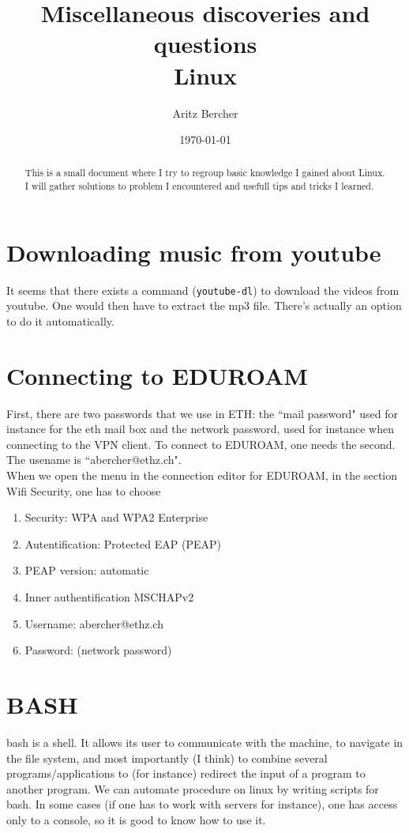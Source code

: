 \documentclass[11pt,a4paper]{article} %
\title{Miscellaneous discoveries and questions\\ Linux}
\author{Aritz Bercher}
\date{\today}
\begin{document}
\maketitle

\begin{abstract}
This is a small document where I try to regroup basic knowledge I gained about Linux. I will gather solutions to problem I encountered and usefull tips and tricks I learned.
\end{abstract}

\section{Downloading music from youtube}
It seems that there exists a command (\texttt{youtube-dl}) to download the videos from youtube. One would then have to extract the mp3 file. There's actually an option to do it automatically.

\section{Connecting to EDUROAM}
First, there are two passwords that we use in ETH: the ``mail password" used for instance for the eth mail box and the network password, used for instance when connecting to the VPN client. To connect to EDUROAM, one needs the second. The usename is ``abercher@ethz.ch".\\
When we open the menu in the connection editor for EDUROAM, in the section Wifi Security, one has to choose
\begin{enumerate}
\item Security: WPA and WPA2 Enterprise
\item Autentification: Protected EAP (PEAP)
\item PEAP version: automatic
\item Inner authentification MSCHAPv2
\item Username: abercher@ethz.ch
\item Password: (network password)
\end{enumerate}

\section{BASH}
bash is a shell. It allows its user to communicate with the machine, to navigate in the file system, and most importantly (I think) to combine several programs\slash applications to (for instance) redirect the input of a program to another program. We can automate procedure on linux by writing scripts for bash. In some cases (if one has to work with servers for instance), one has access only to a console, so it is good to know how to use it.
\end{document}

